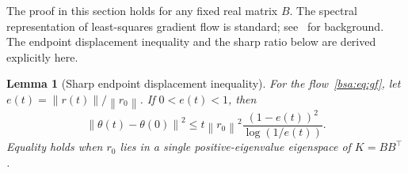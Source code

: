 \documentclass[11pt,letterpaper]{article}
\newcommand{\bsaNorm}[1]{\left\lVert #1\right\rVert}
\newtheorem{bsaLemma}{Lemma}[section]
\theoremstyle{remark}
\theoremstyle{plain}
\begin{document}
The proof in this section holds for any fixed real matrix $B$. The spectral representation of least-squares gradient flow is standard; see~\cite{bsa-ali} for background. The endpoint displacement inequality and the sharp ratio below are derived explicitly here.

\begin{bsaLemma}[Sharp endpoint displacement inequality]
\label{bsa:lem:displacement}
For the flow~\eqref{bsa:eq:gf}, let $e(t)=\bsaNorm{r(t)}/\bsaNorm{r_0}$. If $0<e(t)<1$, then
\begin{equation}
 \bsaNorm{\theta(t)-\theta(0)}^2
 \le t\bsaNorm{r_0}^2\frac{(1-e(t))^2}{\log(1/e(t))}.
 \label{bsa:eq:displacement}
\end{equation}
Equality holds when $r_0$ lies in a single positive-eigenvalue eigenspace of $K=BB^\top$.
\end{bsaLemma}
\end{document}
